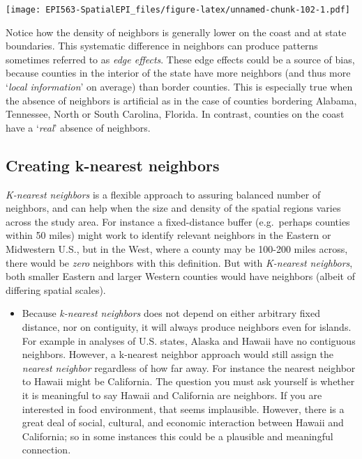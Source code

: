 \documentclass[
]{book}
\newenvironment{rmdblock}[1]
  {%
  \begin{itemize}
  \renewcommand{\labelitemi}{
    \raisebox{-.7\height}[0pt][0pt]{
      {\setkeys{Gin}{width=3em,keepaspectratio}\texttt{[image: images/\#1]}}
    }
  }
  \item
  }
  {
  \end{itemize}
  }
\newenvironment{rmdnote}
  {\begin{rmdblock}{note}}
  {\end{rmdblock}}
\begin{document}
\texttt{[image: EPI563-SpatialEPI\_files/figure-latex/unnamed-chunk-102-1.pdf]}

Notice how the density of neighbors is generally lower on the coast and at state boundaries. This systematic difference in neighbors can produce patterns sometimes referred to as \emph{edge effects}. These edge effects could be a source of bias, because counties in the interior of the state have more neighbors (and thus more `\emph{local information}' on average) than border counties. This is especially true when the absence of neighbors is artificial as in the case of counties bordering Alabama, Tennessee, North or South Carolina, Florida. In contrast, counties on the coast have a `\emph{real}' absence of neighbors.

\hypertarget{creating-k-nearest-neighbors}{%
\subsection{Creating k-nearest neighbors}\label{creating-k-nearest-neighbors}}

\emph{K-nearest neighbors} is a flexible approach to assuring balanced number of neighbors, and can help when the size and density of the spatial regions varies across the study area. For instance a fixed-distance buffer (e.g.~perhaps counties within 50 miles) might work to identify relevant neighbors in the Eastern or Midwestern U.S., but in the West, where a county may be 100-200 miles across, there would be \emph{zero} neighbors with this definition. But with \emph{K-nearest neighbors}, both smaller Eastern and larger Western counties would have neighbors (albeit of differing spatial scales).

\begin{rmdnote}
Because \emph{k-nearest neighbors} does not depend on either arbitrary fixed distance, nor on contiguity, it will always produce neighbors even for islands. For example in analyses of U.S. states, Alaska and Hawaii have no contiguous neighbors. However, a k-nearest neighbor approach would still assign the \emph{nearest neighbor} regardless of how far away. For instance the nearest neighbor to Hawaii might be California. The question you must ask yourself is whether it is meaningful to say Hawaii and California are neighbors. If you are interested in food environment, that seems implausible. However, there is a great deal of social, cultural, and economic interaction between Hawaii and California; so in some instances this could be a plausible and meaningful connection.
\end{rmdnote}
\end{document}
